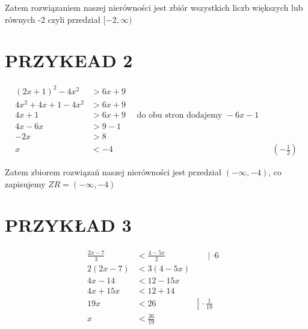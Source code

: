 \documentclass[10pt]{article}
\begin{document}
Zatem rozwiązaniem naszej nierówności jest zbiór wszystkich liczb większych lub równych -2 czyli przedział \([-2, \infty)\)

\section*{PRZYKEAD 2}
\[
\begin{array}{rlrl}
(2 x+1)^{2}-4 x^{2} & >6 x+9 & & \\
4 x^{2}+4 x+1-4 x^{2} & >6 x+9 \\
4 x+1 & >6 x+9 \quad \text { do obu stron dodajemy }-6 x-1 \\
4 x-6 x & >9-1 \\
-2 x & >8 & & \\
x & <-4 & & \left(-\frac{1}{2}\right)
\end{array}
\]

Zatem zbiorem rozwiązań naszej nierówności jest przedział \((-\infty,-4)\), co zapisujemy \(Z R=(-\infty,-4)\)

\section*{PRZYKŁAD 3}
\[
\begin{array}{rlrl}
\frac{2 x-7}{3} & <\frac{4-5 x}{2} & \quad \mid \cdot 6 \\
2(2 x-7) & <3(4-5 x) & \\
4 x-14 & <12-15 x & & \\
4 x+15 x & <12+14 & \\
19 x & <26 & \left\lvert\, \cdot \frac{1}{19}\right. \\
x & <\frac{26}{19} &
\end{array}
\]
\end{document}
